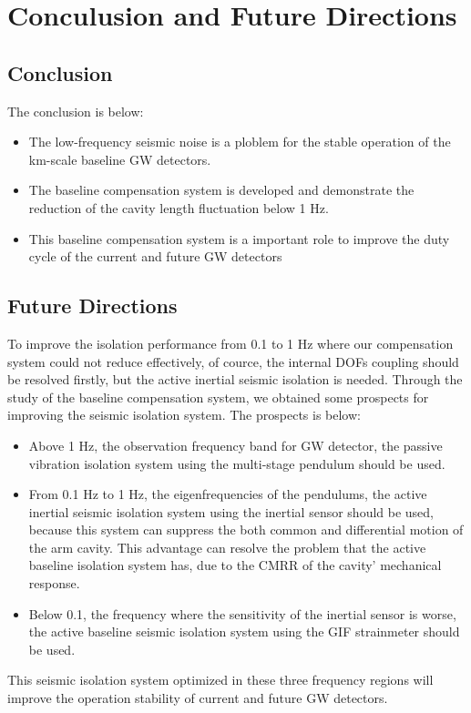 \chapter{Conculusion and Future Directions} \label{chap6}
\section{Conclusion}
The conclusion is below:
\begin{itemize}
\item The low-frequency seismic noise is a ploblem for the stable operation of the km-scale baseline GW detectors.
\item The baseline compensation system is developed and demonstrate the reduction of the cavity length fluctuation below 1 Hz.
\item This baseline compensation system is a important role to improve the duty cycle of the current and future GW detectors
\end{itemize}


\section{Future Directions}
To improve the isolation performance from 0.1 to 1 Hz where our compensation system could not reduce effectively, of cource, the internal DOFs coupling should be resolved firstly, but the active inertial seismic isolation is needed. Through the study of the baseline compensation system, we obtained some prospects for improving the seismic isolation system. The prospects is below:
\begin{itemize}
\item Above 1 Hz, the observation frequency band for GW detector, the passive vibration isolation system using the multi-stage pendulum should be used. 
\item From 0.1 Hz to 1 Hz, the eigenfrequencies of the pendulums, the active inertial seismic isolation system using the inertial sensor should be used, because this system can suppress the both common and differential motion of the arm cavity. This advantage can resolve the problem that the active baseline isolation system has, due to the CMRR of the cavity' mechanical response.
\item Below 0.1, the frequency where the sensitivity of the inertial sensor is worse, the active baseline seismic isolation system using the GIF strainmeter should be used.
\end{itemize}
This seismic isolation system optimized in these three frequency regions will improve the operation stability of current and future GW detectors.
